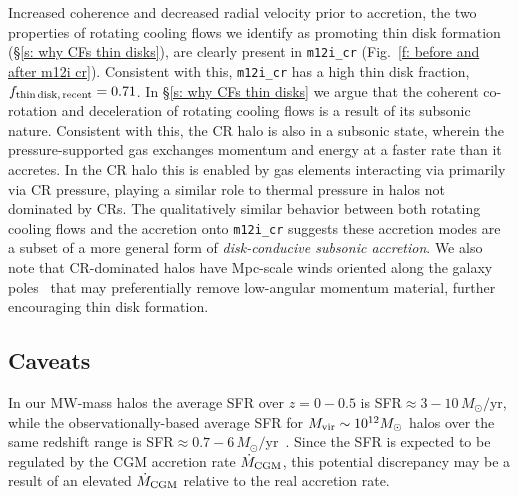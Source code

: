\documentclass[fleqn,usenatbib]{mnras}
\newcommand{\Mdot}{\dot{M}}
\begin{document}
Increased coherence and decreased radial velocity prior to accretion, the two properties of rotating cooling flows we identify as promoting thin disk formation (\S\ref{s: why CFs thin disks}), are clearly present in \texttt{m12i\_cr} (Fig.~\ref{f: before and after m12i cr}).
Consistent with this, \texttt{m12i\_cr} has a high thin disk fraction, $f_{\rm thin\,disk,\,recent}=0.71$.
In \S\ref{s: why CFs thin disks} we argue that the coherent co-rotation and deceleration of rotating cooling flows is a result of its subsonic nature.
Consistent with this, the CR halo is also in a subsonic state, wherein the pressure-supported gas exchanges momentum and energy at a faster rate than it accretes.
In the CR halo this is enabled by gas elements interacting via primarily via CR pressure, playing a similar role to thermal pressure in halos not dominated by CRs.
The qualitatively similar behavior between both rotating cooling flows and the accretion onto \texttt{m12i\_cr} suggests these accretion modes are a subset of a more general form of \textit{disk-conducive subsonic accretion}.
We also note that CR-dominated halos have Mpc-scale winds oriented along the galaxy poles~\citep{Hopkins2021, Chan2021} that may preferentially remove low-angular momentum material, further encouraging thin disk formation.

\subsection{Caveats}
\label{s: caveats}


In our MW-mass halos the average SFR over $z=0-0.5$ is SFR$\approx 3-10\,M_\odot/$yr, while the observationally-based average SFR for $M_{\rm vir} \sim 10^{12} M_\odot$ halos over the same redshift range is SFR$\approx 0.7-6\,M_\odot/$yr~\citep{Behroozi2013}.
Since the SFR is expected to be regulated by the CGM accretion rate $\Mdot_{\rm CGM}$, this potential discrepancy may be a result of an elevated  $\Mdot_{\rm CGM}$ relative to the real accretion rate.
\end{document}
